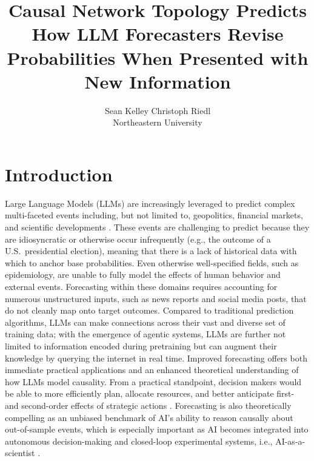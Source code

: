 \documentclass[11pt]{article}
\title{Causal Network Topology Predicts How LLM Forecasters Revise Probabilities When Presented with New Information}
\author{
  Sean Kelley \quad Christoph Riedl \\
  Northeastern University
}
\begin{document}
\maketitle

\begin{abstract}
\end{abstract}

\section{Introduction}
\label{sec:introduction}

Large Language Models (LLMs) are increasingly leveraged to predict complex multi-faceted events including, but not limited to, geopolitics, financial markets, and scientific developments \citep{ye2024mirai, schoenegger2023llm, halawi2024approaching}. These events are challenging to predict because they are idiosyncratic or otherwise occur infrequently (e.g., the outcome of a U.S.\ presidential election), meaning that there is a lack of historical data with which to anchor base probabilities. Even otherwise well-specified fields, such as epidemiology, are unable to fully model the effects of human behavior and external events. Forecasting within these domains requires accounting for numerous unstructured inputs, such as news reports and social media posts, that do not cleanly map onto target outcomes. Compared to traditional prediction algorithms, LLMs can make connections across their vast and diverse set of training data; with the emergence of agentic systems, LLMs are further not limited to information encoded during pretraining but can augment their knowledge by querying the internet in real time. Improved forecasting offers both immediate practical applications and an enhanced theoretical understanding of how LLMs model causality. From a practical standpoint, decision makers would be able to more efficiently plan, allocate resources, and better anticipate first- and second-order effects of strategic actions \citep{perezortiz2024prediction}. Forecasting is also theoretically compelling as an unbiased benchmark of AI's ability to reason causally about out-of-sample events, which is especially important as AI becomes integrated into autonomous decision-making \citep{candrian2022rise} and closed-loop experimental systems, i.e., AI-as-a-scientist \citep{gottweis2025aicoscientist}.
\end{document}
